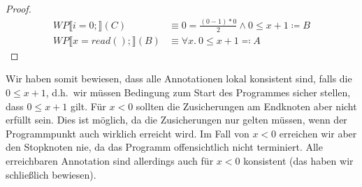 \documentclass[hidelinks]{article}
\theoremstyle{plain}
\theoremstyle{definition}
\theoremstyle{rem}
\begin{document}
\begin{sloppypar}
\begin{proof}
\begin{align*}
WP\llbracket i=0;\rrbracket(C)&\equiv 0=\frac{(0-1)*0}{2}\wedge 0\le x+1\coloneqq B\\
WP\llbracket x=read();\rrbracket(B)&\equiv \forall x.\ 0\le x+1\eqqcolon A
\end{align*}
\end{proof}
Wir haben somit bewiesen, dass alle Annotationen lokal konsistent sind, falls die $0\le x+1$, d.h.\ wir müssen Bedingung zum Start des Programmes sicher stellen, dass $0\le x+1$ gilt. Für $x<0$ sollten die Zusicherungen am Endknoten aber nicht erfüllt sein. Dies ist möglich, da die Zusicherungen nur gelten müssen, wenn der Programmpunkt auch wirklich erreicht wird. Im Fall von $x<0$ erreichen wir aber den Stopknoten nie, da das Programm offensichtlich nicht terminiert. Alle erreichbaren Annotation sind allerdings auch für $x<0$ konsistent (das haben wir schließlich bewiesen).

\end{sloppypar}
\end{document}
